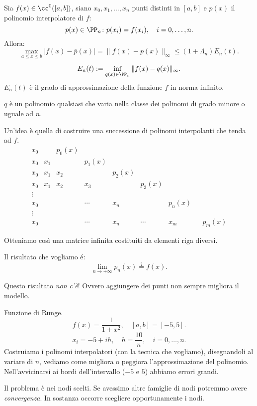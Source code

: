 \begin{teo}\label{teo7.15}
Sia $f(x) \in \cc^0([a,b])$, siano $x_0, x_1, \ldots, x_n$ punti distinti in
$[a,b]$ e $p(x)$ il polinomio interpolatore di $f$:
\[p(x) \in \PP_n \colon p(x_i) = f(x_i), \quad i=0,\ldots, n.\]
Allora:
\[
\max_{a \leq x \leq b}|f(x)-\overline{p}(x)| = \|f(x) - p(x) \|_{\infty}
\leq \left(1+ \Lambda_n\right) E_n(t).
\]

\[
E_n(t) := \inf_{q(x) \in \PP_n} \|f(x)-q(x)\|_\infty.
\]
$E_n(t)$ è il grado di approssimazione della funzione $f$ in norma infinito.
\end{teo}
\begin{osse}
$q$ è un polinomio qualsiasi che varia nella classe dei polinomi di grado
minore o uguale ad $n$.
\end{osse}

Un'idea è quella di costruire una successione di polinomi interpolanti che
tenda ad $f$.
\[
\begin{array}{ccccccccc}
x_0 & &p_0(x) \\
x_0 & x_1 & & p_1(x) \\
x_0 & x_1 & x_2 & &p_2(x) \\
x_0 & x_1 & x_2 & x_3 & &p_3(x) \\
\vdots \\
x_0 &     &    & \cdots & x_n & &p_n(x) \\
\vdots \\
x_0 &     &    &\cdots & x_n & \cdots & x_m & &p_m(x)
\end{array}
\]

Otteniamo così una matrice infinita costituiti da elementi riga diversi. 

Il risultato che vogliamo é:
\[
\lim_{n \to + \infty}p_n(x) \stackrel{?}{=} f(x).
\]

Questo risultato \emph{non c'è}! Ovvero aggiungere dei punti non sempre
migliora il modello.

\begin{exe} Funzione di Runge.
\[f(x) = \frac{1}{1+ x^2}, \quad [a,b] = [-5,5]. \]
\[x_i = -5 +ih, \quad h = \frac{10}{n}, \quad i = 0, \ldots, n.\]
Costruiamo i polinomi interpolatori (con la tecnica che vogliamo), 
disegnandoli al variare di $n$, vediamo come migliora o peggiora 
l'approssimazione del polinomio. Nell'avvicinarsi ai bordi dell'intervallo
($-5$ e $5$) abbiamo errori grandi.
\end{exe}
\begin{notabene}
Il problema è nei nodi scelti. Se avessimo altre famiglie di nodi potremmo
avere \emph{convergenza}. In sostanza occorre scegliere opportunamente
i nodi.
\end{notabene}

